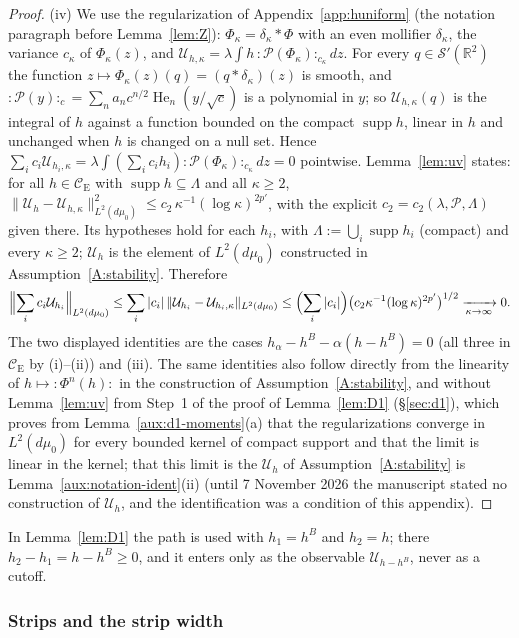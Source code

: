 \documentclass[11pt,a4paper]{article}
\theoremstyle{plain}
\theoremstyle{definition}
\theoremstyle{plain}
\theoremstyle{definition}
\newcommand{\R}{\mathbb{R}}
\newcommand{\CE}{\mathcal{C}_{\mathrm E}}
\DeclareMathOperator{\supp}{supp}
\newcommand{\Uc}{\mathcal U}
\newcommand{\dmu}{d\mu_0}
\begin{document}
\begin{proof}
(iv) We use the regularization of Appendix~\ref{app:huniform} (the notation paragraph before Lemma~\ref{lem:Z}): $\Phi_\kappa=\delta_\kappa*\Phi$ with an even mollifier
$\delta_\kappa$, the variance $c_\kappa$ of $\Phi_\kappa(z)$, and
$\Uc_{h,\kappa}=\lambda\int h\,{:}\mathscr P(\Phi_\kappa){:}_{c_\kappa}dz$.  For every
$q\in\mathcal S'(\R^2)$ the function $z\mapsto\Phi_\kappa(z)(q)=(q*\delta_\kappa)(z)$ is
smooth, and ${:}\mathscr P(y){:}_{c}=\sum_na_nc^{n/2}\operatorname{He}_n(y/\sqrt c)$ is a
polynomial in $y$; so $\Uc_{h,\kappa}(q)$ is the integral of $h$ against a function bounded
on the compact $\supp h$, linear in $h$ and unchanged when $h$ is changed on a null set.
Hence $\sum_ic_i\Uc_{h_i,\kappa}=\lambda\int(\sum_ic_ih_i){:}\mathscr
P(\Phi_\kappa){:}_{c_\kappa}dz=0$ pointwise.  Lemma~\ref{lem:uv} states: for all $h\in\CE$ with
$\supp h\subseteq\Lambda$ and all $\kappa\ge2$, $\|\Uc_h-\Uc_{h,\kappa}\|_{L^2(d\mu_0)}^2\le
c_2\,\kappa^{-1}(\log\kappa)^{2p'}$, with the explicit $c_2=c_2(\lambda,\mathscr P,\Lambda)$
given there.  Its hypotheses hold for each $h_i$, with $\Lambda:=\bigcup_i\supp h_i$
(compact) and every $\kappa\ge2$; $\Uc_h$ is the element of $L^2(\dmu)$ constructed in
Assumption~\ref{A:stability}.  Therefore
\[
 \Bigl\|\sum_ic_i\Uc_{h_i}\Bigr\|_{L^2(\dmu)}
 \le\sum_i|c_i|\,\|\Uc_{h_i}-\Uc_{h_i,\kappa}\|_{L^2(\dmu)}
 \le\Bigl(\sum_i|c_i|\Bigr)\bigl(c_2\kappa^{-1}(\log\kappa)^{2p'}\bigr)^{1/2}
 \xrightarrow[\kappa\to\infty]{}0 .
\]
The two displayed identities are the cases $h_\alpha-h^B-\alpha(h-h^B)=0$ (all three in
$\CE$ by (i)--(ii)) and (iii).  The same identities also follow directly from the linearity
of $h\mapsto{:}\Phi^n(h){:}$ in the construction of Assumption~\ref{A:stability}, and
without Lemma~\ref{lem:uv} from Step~1 of the proof of Lemma~\ref{lem:D1} (\S\ref{sec:d1}),
which proves from Lemma~\ref{aux:d1-moments}(a) that the regularizations converge in
$L^2(\dmu)$ for every bounded kernel of compact support and that the limit is linear in the
kernel; that this limit is the $\Uc_h$ of Assumption~\ref{A:stability} is
Lemma~\ref{aux:notation-ident}(ii) (until 7 November 2026 the manuscript stated no
construction of $\Uc_h$, and the identification was a condition of this appendix).
\end{proof}

In Lemma~\ref{lem:D1} the path is used with $h_1=h^B$ and $h_2=h$; there
$h_2-h_1=h-h^B\ge0$, and it enters only as the observable $\Uc_{h-h^B}$, never as a cutoff.

\subsubsection{Strips and the strip width}\label{sec:notation-strips}
\end{document}

